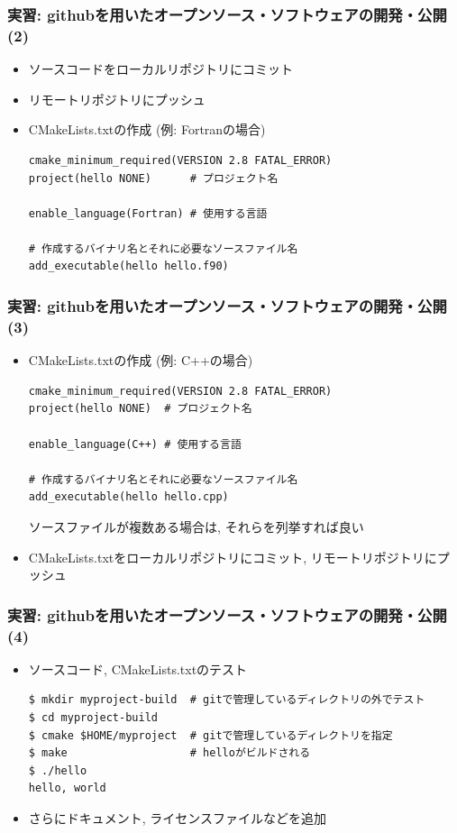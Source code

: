 \begin{frame}[t,fragile]
  \frametitle{実習: githubを用いたオープンソース・ソフトウェアの開発・公開(2)}
  \begin{itemize}
  \item ソースコードをローカルリポジトリにコミット
  \item リモートリポジトリにプッシュ
  \item CMakeLists.txtの作成 (例: Fortranの場合)
\begin{lstlisting}
cmake_minimum_required(VERSION 2.8 FATAL_ERROR)
project(hello NONE)      # プロジェクト名

enable_language(Fortran) # 使用する言語

# 作成するバイナリ名とそれに必要なソースファイル名
add_executable(hello hello.f90)
\end{lstlisting}
  \end{itemize}
\end{frame}

\begin{frame}[t,fragile]
  \frametitle{実習: githubを用いたオープンソース・ソフトウェアの開発・公開(3)}
  \begin{itemize}
  \item CMakeLists.txtの作成 (例: C++の場合)
\begin{lstlisting}
cmake_minimum_required(VERSION 2.8 FATAL_ERROR)
project(hello NONE)  # プロジェクト名

enable_language(C++) # 使用する言語

# 作成するバイナリ名とそれに必要なソースファイル名
add_executable(hello hello.cpp)
\end{lstlisting}
  ソースファイルが複数ある場合は, それらを列挙すれば良い \\[0.5em]
  \item CMakeLists.txtをローカルリポジトリにコミット, リモートリポジトリにプッシュ
  \end{itemize}
\end{frame}

\begin{frame}[t,fragile]
  \frametitle{実習: githubを用いたオープンソース・ソフトウェアの開発・公開(4)}
  \begin{itemize}
  \item ソースコード, CMakeLists.txtのテスト
\begin{lstlisting}
$ mkdir myproject-build  # gitで管理しているディレクトリの外でテスト
$ cd myproject-build
$ cmake $HOME/myproject  # gitで管理しているディレクトリを指定
$ make                   # helloがビルドされる
$ ./hello
hello, world
\end{lstlisting}
  \item さらにドキュメント, ライセンスファイルなどを追加
  \end{itemize}
\end{frame}


